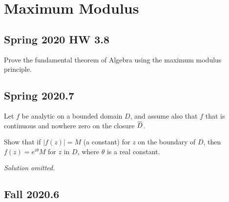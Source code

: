 \hypertarget{maximum-modulus}{%
\section{Maximum Modulus}\label{maximum-modulus}}

\hypertarget{spring-2020-hw-3.8}{%
\subsection{Spring 2020 HW 3.8}\label{spring-2020-hw-3.8}}

\begin{problem}[?]

Prove the fundamental theorem of Algebra using the maximum modulus
principle.

\end{problem}

\hypertarget{spring-2020.7}{%
\subsection{Spring 2020.7}\label{spring-2020.7}}

\begin{problem}[?]

Let \(f\) be analytic on a bounded domain \(D\), and assume also that
\(f\) that is continuous and nowhere zero on the closure
\(\mkern 1.5mu\overline{\mkern-1.5muD\mkern-1.5mu}\mkern 1.5mu\).

Show that if \(|f(z)|=M\) (a constant) for \(z\) on the boundary of
\(D\), then \(f(z)=e^{i \theta} M\) for \(z\) in \(D\), where \(\theta\)
is a real constant.

\end{problem}

\emph{Solution omitted.}

\hypertarget{fall-2020.6}{%
\subsection{Fall 2020.6}\label{fall-2020.6}}

